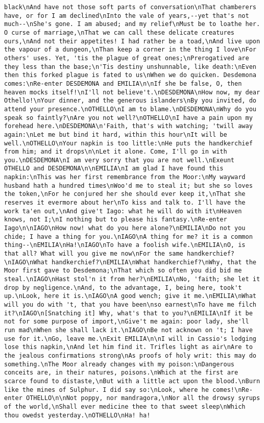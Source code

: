 \begin{verbatim}
black\nAnd have not those soft parts of conversation\nThat chamberers have, or for I am declined\nInto the vale of years,--yet that's not much--\nShe's gone. I am abused; and my relief\nMust be to loathe her. O curse of marriage,\nThat we can call these delicate creatures ours,\nAnd not their appetites! I had rather be a toad,\nAnd live upon the vapour of a dungeon,\nThan keep a corner in the thing I love\nFor others' uses. Yet, 'tis the plague of great ones;\nPrerogatived are they less than the base;\n'Tis destiny unshunnable, like death:\nEven then this forked plague is fated to us\nWhen we do quicken. Desdemona comes:\nRe-enter DESDEMONA and EMILIA\n\nIf she be false, O, then heaven mocks itself!\nI'll not believe't.\nDESDEMONA\nHow now, my dear Othello!\nYour dinner, and the generous islanders\nBy you invited, do attend your presence.\nOTHELLO\nI am to blame.\nDESDEMONA\nWhy do you speak so faintly?\nAre you not well?\nOTHELLO\nI have a pain upon my forehead here.\nDESDEMONA\n'Faith, that's with watching; 'twill away again:\nLet me but bind it hard, within this hour\nIt will be well.\nOTHELLO\nYour napkin is too little:\nHe puts the handkerchief from him; and it drops\n\nLet it alone. Come, I'll go in with you.\nDESDEMONA\nI am very sorry that you are not well.\nExeunt OTHELLO and DESDEMONA\n\nEMILIA\nI am glad I have found this napkin:\nThis was her first remembrance from the Moor:\nMy wayward husband hath a hundred times\nWoo'd me to steal it; but she so loves the token,\nFor he conjured her she should ever keep it,\nThat she reserves it evermore about her\nTo kiss and talk to. I'll have the work ta'en out,\nAnd give't Iago: what he will do with it\nHeaven knows, not I;\nI nothing but to please his fantasy.\nRe-enter Iago\n\nIAGO\nHow now! what do you here alone?\nEMILIA\nDo not you chide; I have a thing for you.\nIAGO\nA thing for me? it is a common thing--\nEMILIA\nHa!\nIAGO\nTo have a foolish wife.\nEMILIA\nO, is that all? What will you give me now\nFor the same handkerchief?\nIAGO\nWhat handkerchief?\nEMILIA\nWhat handkerchief?\nWhy, that the Moor first gave to Desdemona;\nThat which so often you did bid me steal.\nIAGO\nHast stol'n it from her?\nEMILIA\nNo, 'faith; she let it drop by negligence.\nAnd, to the advantage, I, being here, took't up.\nLook, here it is.\nIAGO\nA good wench; give it me.\nEMILIA\nWhat will you do with 't, that you have been\nso earnest\nTo have me filch it?\nIAGO\n[Snatching it] Why, what's that to you?\nEMILIA\nIf it be not for some purpose of import,\nGive't me again: poor lady, she'll run mad\nWhen she shall lack it.\nIAGO\nBe not acknown on 't; I have use for it.\nGo, leave me.\nExit EMILIA\n\nI will in Cassio's lodging lose this napkin,\nAnd let him find it. Trifles light as air\nAre to the jealous confirmations strong\nAs proofs of holy writ: this may do something.\nThe Moor already changes with my poison:\nDangerous conceits are, in their natures, poisons.\nWhich at the first are scarce found to distaste,\nBut with a little act upon the blood.\nBurn like the mines of Sulphur. I did say so:\nLook, where he comes!\nRe-enter OTHELLO\n\nNot poppy, nor mandragora,\nNor all the drowsy syrups of the world,\nShall ever medicine thee to that sweet sleep\nWhich thou owedst yesterday.\nOTHELLO\nHa! ha! 
\end{verbatim}
